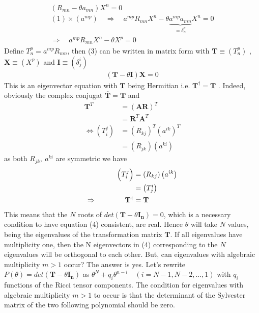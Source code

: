 \begin{align}
\left( R_{mn} -\theta a_{mn}\right)X^n = 0\\
 (1)\times (a^{mp}) \quad \Rightarrow \quad a^{mp} R_{mn}X^n  -\theta \underbrace{a^{mp}a_{mn}}_{=\delta^p_n}X^n  =0\\
 \Rightarrow \quad a^{mp} R_{mn}X^n  -\theta X^p  =0
\end{align}
Define $T^{p}_{n} =  a^{mp} R_{mn} $, then (3) can be written in matrix form with $\mathbf{T}\equiv (T^{p}_{n})$ , $\mathbf{X}\equiv (X^p)$ and $\mathbf{I} \equiv (\delta^i_j)$
\begin{align}
\left(\mathbf{T}-\theta \mathbf{I}\right)\mathbf{X} =0
\end{align}
This is an eigenvector equation with $\mathbf{T}$ being Hermitian i.e. $\mathbf{T}^{\dag} =\mathbf{T}$ . Indeed, obviously the complex conjugat $\mathbf{\overline{T}} = \textbf{T}$ and  
\begin{align*}
\mathbf{T}^T &=  \left(\mathbf{AR}\right)^T\\
 &= \mathbf{R}^T \mathbf{A}^T\\
 \Leftrightarrow \left(T^{j}_{i}\right)  &= \left(R_{kj}\right)^T\left(a^{ik}\right)^T\\
 &= \left(R_{jk}\right)\left(a^{ki}\right)
\end{align*}         
as both $ R_{jk}, \ a^{ki}$ are symmetric we  have
\begin{align*}
\left(T^{j}_{i}\right) &= \left(R_{kj}\right)\left(a^{ik}\right)\\
 &= \left(T^{i}_{j}\right)\\
 \Rightarrow \quad\quad\quad\quad \mathbf{T}^{\dag} &=\mathbf{T}
\end{align*} 
This means that the $N$ roots of $det\left(\mathbf{T}-\theta \mathbf{I_n}\right)=0$, which is a necessary condition to have equation (4) consistent, are real. Hence $\theta$ will take $N$ values, being the eigenvalues of the transformation matrix $\textbf{T}$. If all eigenvalues have multiplicity one, then  the N eigenvectors in (4) corresponding to the $N$ eigenvalues will be  orthogonal to each other. But, can eigenvalues with algebraic multiplicity $ m > 1$ occur? The answer is yes. Let's rewrite $P(\theta) = det\left(\mathbf{T}-\theta \mathbf{I_n}\right)$ as $\theta^{N} + q_i \theta^{n-i}  \quad (i= N-1,N-2,\dots, 1)$ with $q_i$ functions of the Ricci tensor components. The condition for eigenvalues with algebraic multiplicity $ m > 1$  to occur is that the determinant of the Sylvester matrix of the two following polynomial should be zero.
